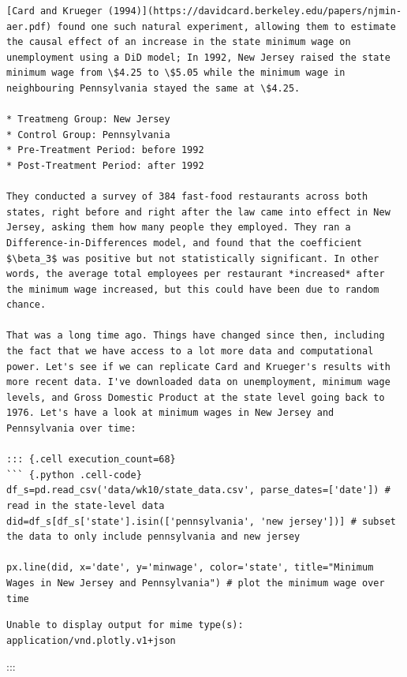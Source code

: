 \documentclass[
  letterpaper,
  DIV=11,
  numbers=noendperiod]{scrreprt}
\begin{document}
\begin{verbatim}
[Card and Krueger (1994)](https://davidcard.berkeley.edu/papers/njmin-aer.pdf) found one such natural experiment, allowing them to estimate the causal effect of an increase in the state minimum wage on unemployment using a DiD model; In 1992, New Jersey raised the state minimum wage from \$4.25 to \$5.05 while the minimum wage in neighbouring Pennsylvania stayed the same at \$4.25. 
   
* Treatmeng Group: New Jersey 
* Control Group: Pennsylvania
* Pre-Treatment Period: before 1992
* Post-Treatment Period: after 1992

They conducted a survey of 384 fast-food restaurants across both states, right before and right after the law came into effect in New Jersey, asking them how many people they employed. They ran a Difference-in-Differences model, and found that the coefficient $\beta_3$ was positive but not statistically significant. In other words, the average total employees per restaurant *increased* after the minimum wage increased, but this could have been due to random chance. 

That was a long time ago. Things have changed since then, including the fact that we have access to a lot more data and computational power. Let's see if we can replicate Card and Krueger's results with more recent data. I've downloaded data on unemployment, minimum wage levels, and Gross Domestic Product at the state level going back to 1976. Let's have a look at minimum wages in New Jersey and Pennsylvania over time:

::: {.cell execution_count=68}
``` {.python .cell-code}
df_s=pd.read_csv('data/wk10/state_data.csv', parse_dates=['date']) # read in the state-level data
did=df_s[df_s['state'].isin(['pennsylvania', 'new jersey'])] # subset the data to only include pennsylvania and new jersey

px.line(did, x='date', y='minwage', color='state', title="Minimum Wages in New Jersey and Pennsylvania") # plot the minimum wage over time
\end{verbatim}

\begin{verbatim}
Unable to display output for mime type(s): application/vnd.plotly.v1+json
\end{verbatim}

:::
\end{document}
